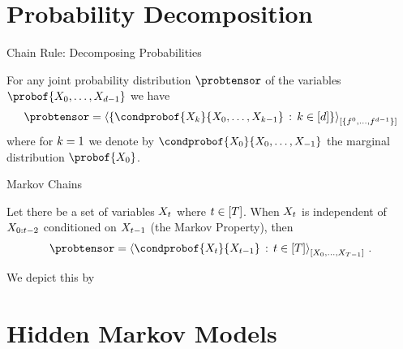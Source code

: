 \documentclass{beamer}
\begin{document}
\section{Probability Decomposition}

\begin{frame}{Chain Rule: Decomposing Probabilities}

\begin{theorem}\label{the:chainRule}
	For any joint probability distribution $\probtensor$ of the variables $\probof{\catvariableof{0},\ldots,\catvariableof{\atomorder-1}}$ we have
	\begin{align*}
		\probtensor = \contractionof{\{\condprobof{\catvariableof{\atomenumerator}}{\catvariableof{0},\ldots,\catvariableof{\atomenumerator-1}}\, : \, \atomenumeratorin \}}{\{\enumeratedatoms\}}
	\end{align*}
	where for $k=1$ we denote by $ \condprobof{\catvariableof{0}}{\catvariableof{0},\ldots,\catvariableof{-1}}$ the marginal distribution $\probof{\catvariableof{0}}$.
\end{theorem}

\end{frame}


\begin{frame}{Markov Chains}

\begin{theorem}\label{the:MarkovChain}
	Let there be a set of variables $X_{t}$ where $t\in[T]$.
	When $X_{t}$ is independent of $X_{0:{t-2}}$ conditioned on $X_{t-1}$ (the Markov Property), then
	\begin{align*}
		\probtensor = \contractionof{\condprobof{\catvariableof{\tenumerator}}{\catvariableof{\tenumerator-1}}\, : \, \tenumeratorin}{
		\catvariableof{0},\ldots,\catvariableof{\tdim-1}
		} \, . 
	\end{align*}	
\end{theorem}

We depict this by 
\begin{center}
	
\end{center}


\end{frame}




\section{Hidden Markov Models}
\end{document}

